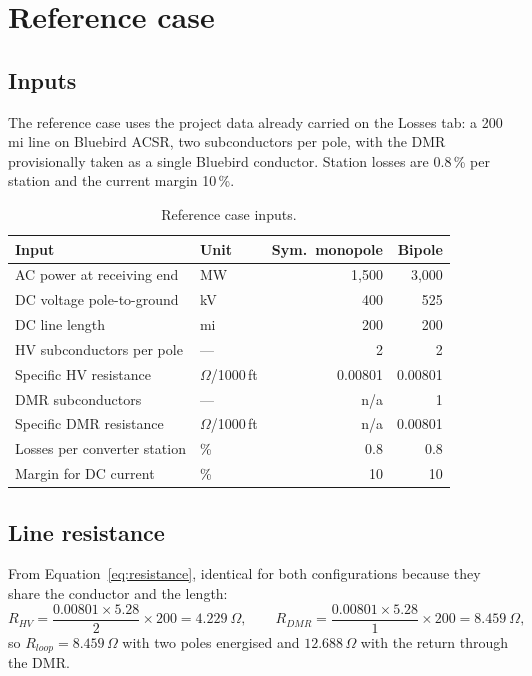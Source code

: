 \section{Reference case}
\label{sec:reference}

\subsection{Inputs}
The reference case uses the project data already carried on the Losses tab: a
200\,mi line on Bluebird ACSR, two subconductors per pole, with the DMR
provisionally taken as a single Bluebird conductor. Station losses are 0.8\,\%
per station and the current margin 10\,\%.

\begin{table}[htbp]
  \centering
  \renewcommand{\arraystretch}{1.25}
  \begin{tabularx}{\linewidth}{@{}X l r r@{}}
    \toprule
    \textbf{Input} & \textbf{Unit} &
    \textbf{Sym.\ monopole} & \textbf{Bipole} \\
    \midrule
    AC power at receiving end          & MW                & 1{,}500  & 3{,}000  \\
    DC voltage pole-to-ground          & kV                & 400      & 525      \\
    DC line length                     & mi                & 200      & 200      \\
    HV subconductors per pole          & ---               & 2        & 2        \\
    Specific HV resistance             & $\Omega$/1000\,ft & 0.00801  & 0.00801  \\
    DMR subconductors                  & ---               & n/a      & 1        \\
    Specific DMR resistance            & $\Omega$/1000\,ft & n/a      & 0.00801  \\
    Losses per converter station       & \%                & 0.8      & 0.8      \\
    Margin for DC current              & \%                & 10       & 10       \\
    \bottomrule
  \end{tabularx}
  \caption{Reference case inputs.}
  \label{tab:refinputs}
\end{table}

\subsection{Line resistance}
From Equation~\eqref{eq:resistance}, identical for both configurations because
they share the conductor and the length:
\[
  R_{HV} = \frac{0.00801 \times 5.28}{2}\times 200 = 4.229\ \Omega,
  \qquad
  R_{DMR} = \frac{0.00801 \times 5.28}{1}\times 200 = 8.459\ \Omega,
\]
so $R_{loop} = 8.459\,\Omega$ with two poles energised and
$12.688\,\Omega$ with the return through the DMR.

